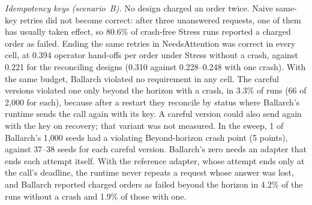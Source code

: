 \documentclass[11pt]{article}
\theoremstyle{definition}
\theoremstyle{plain}
\begin{document}
\emph{Idempotency keys (scenario~B).} No design charged an order twice. Naive same-key retries did not become correct: after three unanswered requests, one of them has usually taken effect, so 80.6\% of crash-free Stress runs reported a charged order as failed. Ending the same retries in \textsf{NeedsAttention} was correct in every cell, at 0.394 operator hand-offs per order under Stress without a crash, against 0.221 for the reconciling designs (0.310 against 0.228--0.248 with one crash). With the same budget, Ballarch violated no requirement in any cell. The careful versions violated one only beyond the horizon with a crash, in 3.3\% of runs (66 of 2{,}000 for each), because after a restart they reconcile by status where Ballarch's runtime sends the call again with its key. A careful version could also send again with the key on recovery; that variant was not measured. In the sweep, 1 of Ballarch's 1{,}000 seeds had a violating Beyond-horizon crash point (5 points), against 37--38 seeds for each careful version. Ballarch's zero needs an adapter that ends each attempt itself. With the reference adapter, whose attempt ends only at the call's deadline, the runtime never repeats a request whose answer was lost, and Ballarch reported charged orders as failed beyond the horizon in 4.2\% of the runs without a crash and 1.9\% of those with one.
\end{document}
